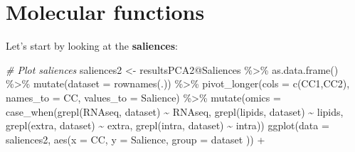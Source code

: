 \documentclass[
]{book}
\newenvironment{Shaded}{\begin{snugshade}}{\end{snugshade}}
\newcommand{\AttributeTok}[1]{\textcolor[rgb]{0.77,0.63,0.00}{#1}}
\newcommand{\CommentTok}[1]{\textcolor[rgb]{0.56,0.35,0.01}{\textit{#1}}}
\newcommand{\FunctionTok}[1]{\textcolor[rgb]{0.00,0.00,0.00}{#1}}
\newcommand{\NormalTok}[1]{#1}
\newcommand{\OtherTok}[1]{\textcolor[rgb]{0.56,0.35,0.01}{#1}}
\newcommand{\SpecialCharTok}[1]{\textcolor[rgb]{0.00,0.00,0.00}{#1}}
\newcommand{\StringTok}[1]{\textcolor[rgb]{0.31,0.60,0.02}{#1}}
\begin{document}
\hypertarget{molecular-functions}{%
\section{Molecular functions}\label{molecular-functions}}

Let's start by looking at the \textbf{saliences}:

\begin{Shaded}
\begin{Highlighting}[]
\CommentTok{\# Plot saliences}
\NormalTok{saliences2 }\OtherTok{\textless{}{-}}\NormalTok{ resultsPCA2}\SpecialCharTok{@}\NormalTok{Saliences }\SpecialCharTok{\%\textgreater{}\%}
  \FunctionTok{as.data.frame}\NormalTok{() }\SpecialCharTok{\%\textgreater{}\%}
  \FunctionTok{mutate}\NormalTok{(}\AttributeTok{dataset =} \FunctionTok{rownames}\NormalTok{(.)) }\SpecialCharTok{\%\textgreater{}\%}
  \FunctionTok{pivot\_longer}\NormalTok{(}\AttributeTok{cols =} \FunctionTok{c}\NormalTok{(}\StringTok{\textquotesingle{}CC1\textquotesingle{}}\NormalTok{,}\StringTok{\textquotesingle{}CC2\textquotesingle{}}\NormalTok{),}
               \AttributeTok{names\_to =} \StringTok{\textquotesingle{}CC\textquotesingle{}}\NormalTok{,}
               \AttributeTok{values\_to =} \StringTok{\textquotesingle{}Salience\textquotesingle{}}\NormalTok{) }\SpecialCharTok{\%\textgreater{}\%}
  \FunctionTok{mutate}\NormalTok{(}\AttributeTok{omics =} \FunctionTok{case\_when}\NormalTok{(}\FunctionTok{grepl}\NormalTok{(}\StringTok{\textquotesingle{}RNAseq\textquotesingle{}}\NormalTok{, dataset) }\SpecialCharTok{\textasciitilde{}} \StringTok{\textquotesingle{}RNAseq\textquotesingle{}}\NormalTok{,}
                           \FunctionTok{grepl}\NormalTok{(}\StringTok{\textquotesingle{}lipids\textquotesingle{}}\NormalTok{, dataset) }\SpecialCharTok{\textasciitilde{}} \StringTok{\textquotesingle{}lipids\textquotesingle{}}\NormalTok{,}
                           \FunctionTok{grepl}\NormalTok{(}\StringTok{\textquotesingle{}extra\textquotesingle{}}\NormalTok{, dataset) }\SpecialCharTok{\textasciitilde{}} \StringTok{\textquotesingle{}extra\textquotesingle{}}\NormalTok{,}
                           \FunctionTok{grepl}\NormalTok{(}\StringTok{\textquotesingle{}intra\textquotesingle{}}\NormalTok{, dataset) }\SpecialCharTok{\textasciitilde{}} \StringTok{\textquotesingle{}intra\textquotesingle{}}\NormalTok{))}
  \FunctionTok{ggplot}\NormalTok{(}\AttributeTok{data =}\NormalTok{ saliences2,}
       \FunctionTok{aes}\NormalTok{(}\AttributeTok{x =}\NormalTok{ CC, }\AttributeTok{y =}\NormalTok{ Salience, }\AttributeTok{group =}\NormalTok{ dataset )) }\SpecialCharTok{+}

\end{Highlighting}
\end{Shaded}
\end{document}
